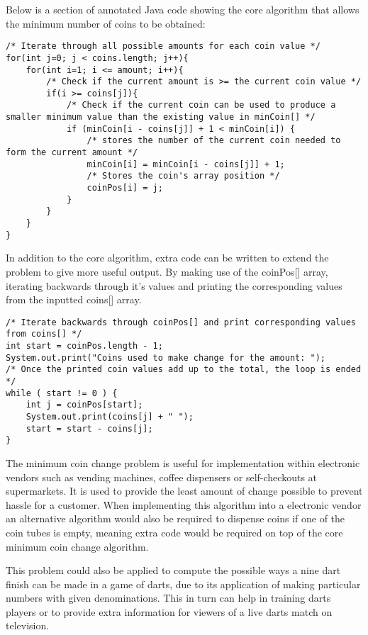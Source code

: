 
Below is a section of annotated Java code showing the core algorithm that allows the minimum number of coins to be obtained:

\begin{lstlisting}
/* Iterate through all possible amounts for each coin value */
for(int j=0; j < coins.length; j++){
	for(int i=1; i <= amount; i++){
		/* Check if the current amount is >= the current coin value */
		if(i >= coins[j]){
			/* Check if the current coin can be used to produce a smaller minimum value than the existing value in minCoin[] */
			if (minCoin[i - coins[j]] + 1 < minCoin[i]) {
				/* stores the number of the current coin needed to form the current amount */
				minCoin[i] = minCoin[i - coins[j]] + 1;
				/* Stores the coin's array position */
				coinPos[i] = j;
			}
		}
	}
}
\end{lstlisting}

\smallbreak\noindent
In addition to the core algorithm, extra code can be written to extend the problem to give more useful output. By making use of the coinPos[] array, iterating backwards through it's values and printing the corresponding values from the inputted coins[] array.

\begin{lstlisting}
/* Iterate backwards through coinPos[] and print corresponding values from coins[] */
int start = coinPos.length - 1;
System.out.print("Coins used to make change for the amount: ");
/* Once the printed coin values add up to the total, the loop is ended */
while ( start != 0 ) {
	int j = coinPos[start];
	System.out.print(coins[j] + " ");
	start = start - coins[j];
}
\end{lstlisting}

\noindent
The minimum coin change problem is useful for implementation within electronic vendors such as vending machines, coffee dispensers or self-checkouts at supermarkets. It is used to provide the least amount of change possible to prevent hassle for a customer. When implementing this algorithm into a electronic vendor an alternative algorithm would also be required to dispense coins if one of the coin tubes is empty, meaning extra code would be required on top of the core minimum coin change algorithm. 

This problem could also be applied to compute the possible ways a nine dart finish can be made in a game of darts, due to its application of making particular numbers with given denominations. This in turn can help in training darts players or to provide extra information for viewers of a live darts match on television.



